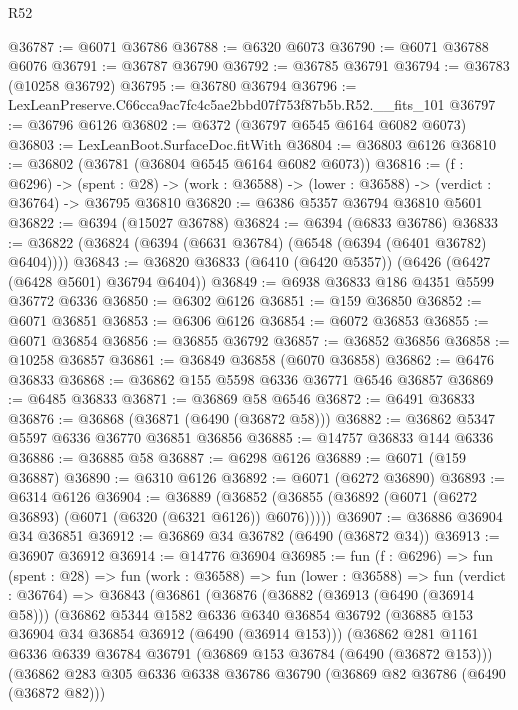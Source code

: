 \begin{lexlean}{R52}
\begin{coremodule}
@36787 := @6071 @36786
@36788 := @6320 @6073
@36790 := @6071 @36788 @6076
@36791 := @36787 @36790
@36792 := @36785 @36791
@36794 := @36783 (@10258 @36792)
@36795 := @36780 @36794
@36796 := LexLeanPreserve.C66cca9ac7fc4c5ae2bbd07f753f87b5b.R52.__fits_101
@36797 := @36796 @6126
@36802 := @6372 (@36797 @6545 @6164 @6082 @6073)
@36803 := LexLeanBoot.SurfaceDoc.fitWith
@36804 := @36803 @6126
@36810 := @36802 (@36781 (@36804 @6545 @6164 @6082 @6073))
@36816 := (f : @6296) ->
  (spent : @28) -> (work : @36588) -> (lower : @36588) -> (verdict : @36764) -> @36795 @36810
@36820 := @6386 @5357 @36794 @36810 @5601
@36822 := @6394 (@15027 @36788)
@36824 := @6394 (@6833 @36786)
@36833 := @36822 (@36824 (@6394 (@6631 @36784) (@6548 (@6394 (@6401 @36782) @6404))))
@36843 := @36820 @36833 (@6410 (@6420 @5357)) (@6426 (@6427 (@6428 @5601) @36794 @6404))
@36849 := @6938 @36833 @186 @4351 @5599 @36772 @6336
@36850 := @6302 @6126
@36851 := @159 @36850
@36852 := @6071 @36851
@36853 := @6306 @6126
@36854 := @6072 @36853
@36855 := @6071 @36854
@36856 := @36855 @36792
@36857 := @36852 @36856
@36858 := @10258 @36857
@36861 := @36849 @36858 (@6070 @36858)
@36862 := @6476 @36833
@36868 := @36862 @155 @5598 @6336 @36771 @6546 @36857
@36869 := @6485 @36833
@36871 := @36869 @58 @6546
@36872 := @6491 @36833
@36876 := @36868 (@36871 (@6490 (@36872 @58)))
@36882 := @36862 @5347 @5597 @6336 @36770 @36851 @36856
@36885 := @14757 @36833 @144 @6336
@36886 := @36885 @58
@36887 := @6298 @6126
@36889 := @6071 (@159 @36887)
@36890 := @6310 @6126
@36892 := @6071 (@6272 @36890)
@36893 := @6314 @6126
@36904 := @36889
    (@36852 (@36855 (@36892 (@6071 (@6272 @36893) (@6071 (@6320 (@6321 @6126)) @6076)))))
@36907 := @36886 @36904 @34 @36851
@36912 := @36869 @34 @36782 (@6490 (@36872 @34))
@36913 := @36907 @36912
@36914 := @14776 @36904
@36985 := fun (f : @6296) =>
  fun (spent : @28) =>
  fun (work : @36588) =>
  fun (lower : @36588) =>
  fun (verdict : @36764) =>
  @36843
    (@36861
      (@36876
        (@36882
          (@36913 (@6490 (@36914 @58)))
          (@36862
            @5344
            @1582
            @6336
            @6340
            @36854
            @36792
            (@36885 @153 @36904 @34 @36854 @36912 (@6490 (@36914 @153)))
            (@36862
              @281
              @1161
              @6336
              @6339
              @36784
              @36791
              (@36869 @153 @36784 (@6490 (@36872 @153)))
              (@36862
                @283
                @305
                @6336
                @6338
                @36786
                @36790
                (@36869 @82 @36786 (@6490 (@36872 @82)))

\end{coremodule}
\end{lexlean}
